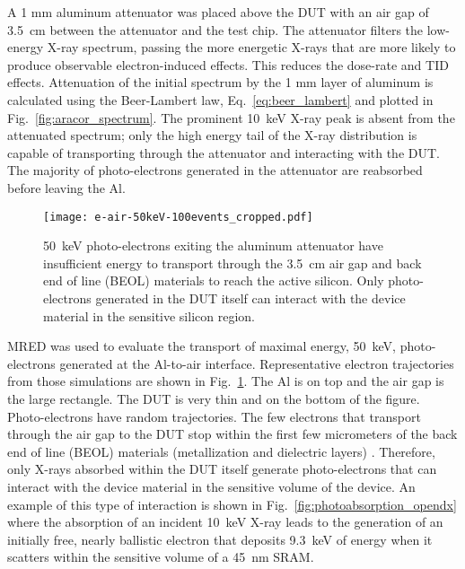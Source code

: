 A 1 mm aluminum attenuator was placed above the DUT with an air gap of 3.5~cm between the attenuator and the test chip.
The attenuator filters the low-energy X-ray spectrum, passing the more energetic X-rays that are more likely to produce observable electron-induced effects. 
This reduces the dose-rate and TID effects. 
Attenuation of the initial spectrum by the 1 mm layer of aluminum is calculated using the Beer-Lambert law, Eq.~\ref{eq:beer_lambert} and plotted in Fig.~\ref{fig:aracor_spectrum}.
The prominent 10~keV X-ray peak is absent from the attenuated spectrum; only the high energy tail of the X-ray distribution is capable of transporting through the attenuator and interacting with the DUT.
The majority of photo-electrons generated in the attenuator are reabsorbed before leaving the Al.

\begin{figure}[tb]
    \begin{center}
        \texttt{[image: e-air-50keV-100events\_cropped.pdf]}
    \end{center}
    \caption{50~keV photo-electrons exiting the aluminum attenuator have insufficient energy to transport through the 3.5~cm air gap and back end of line (BEOL) materials to reach the active silicon. Only photo-electrons generated in the DUT itself can interact with the device material in the sensitive silicon region.}
    \label{fig:air_gap}
\end{figure}

MRED was used to evaluate the transport of maximal energy, 50~keV, photo-electrons generated at the Al-to-air interface. 
Representative electron trajectories from those simulations are shown in Fig.~\ref{fig:air_gap}.
The Al is on top and the air gap is the large rectangle.
The DUT is very thin and on the bottom of the figure.
Photo-electrons have random trajectories. 
The few electrons that transport through the air gap to the DUT stop within the first few micrometers of the back end of line (BEOL) materials (metallization and dielectric layers) \cite{Dasgupta:2011mg}.
Therefore, only X-rays absorbed within the DUT itself generate photo-electrons that can interact with the device material in the sensitive volume of the device.
An example of this type of interaction is shown in Fig.~\ref{fig:photoabsorption_opendx} where the absorption of an incident 10~keV X-ray leads to the generation of an initially free, nearly ballistic electron that deposits 9.3~keV of energy when it scatters within the sensitive volume of a 45~nm SRAM.

